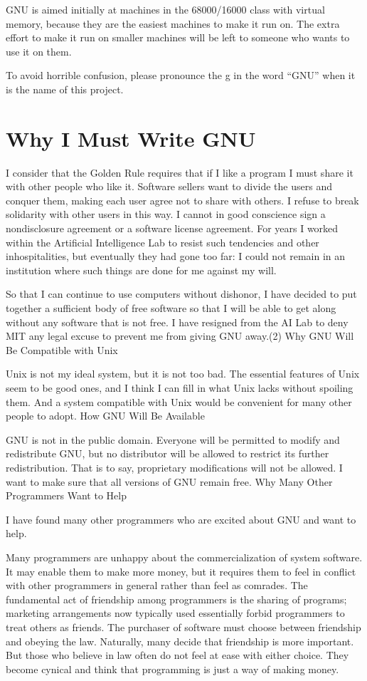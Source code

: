 GNU is aimed initially at machines in the 68000/16000 class with virtual memory, because they are the easiest machines to make it run on. The extra effort to make it run on smaller machines will be left to someone who wants to use it on them.\par
To avoid horrible confusion, please pronounce the g in the word “GNU” when it is the name of this project.
\section{Why I Must Write GNU}

I consider that the Golden Rule requires that if I like a program I must share it with other people who like it. Software sellers want to divide the users and conquer them, making each user agree not to share with others. I refuse to break solidarity with other users in this way. I cannot in good conscience sign a nondisclosure agreement or a software license agreement. For years I worked within the Artificial Intelligence Lab to resist such tendencies and other inhospitalities, but eventually they had gone too far: I could not remain in an institution where such things are done for me against my will.

So that I can continue to use computers without dishonor, I have decided to put together a sufficient body of free software so that I will be able to get along without any software that is not free. I have resigned from the AI Lab to deny MIT any legal excuse to prevent me from giving GNU away.(2)
Why GNU Will Be Compatible with Unix

Unix is not my ideal system, but it is not too bad. The essential features of Unix seem to be good ones, and I think I can fill in what Unix lacks without spoiling them. And a system compatible with Unix would be convenient for many other people to adopt.
How GNU Will Be Available

GNU is not in the public domain. Everyone will be permitted to modify and redistribute GNU, but no distributor will be allowed to restrict its further redistribution. That is to say, proprietary modifications will not be allowed. I want to make sure that all versions of GNU remain free.
Why Many Other Programmers Want to Help

I have found many other programmers who are excited about GNU and want to help.

Many programmers are unhappy about the commercialization of system software. It may enable them to make more money, but it requires them to feel in conflict with other programmers in general rather than feel as comrades. The fundamental act of friendship among programmers is the sharing of programs; marketing arrangements now typically used essentially forbid programmers to treat others as friends. The purchaser of software must choose between friendship and obeying the law. Naturally, many decide that friendship is more important. But those who believe in law often do not feel at ease with either choice. They become cynical and think that programming is just a way of making money.

